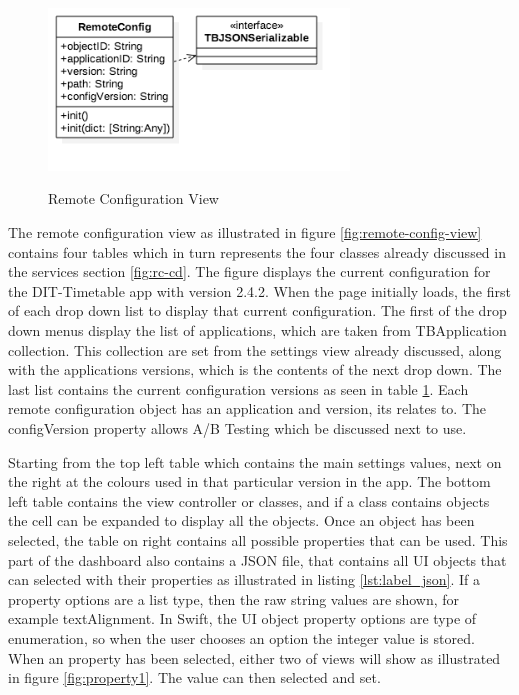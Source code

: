 \begin{figure}[!h]
    \caption{Remote Configuration View}
    \centering
    \includegraphics[width=80mm]{images/classdiagrams/RemoteConfig}
    \label{fig:remote-config-cd}
\end{figure} 

The remote configuration view as illustrated in figure \ref{fig:remote-config-view} contains four tables which in turn represents the four classes already discussed in the services section \ref{fig:rc-cd}. The figure displays the current configuration for the DIT-Timetable app with version 2.4.2. When the page initially loads, the first of each drop down list to display that current configuration. The first of the drop down menus display the list of applications, which are taken from TBApplication collection. This collection are set from the settings view already discussed, along with the applications versions, which is the contents of the next drop down. The last list contains the current configuration versions as seen in table \ref{fig:remote-config-cd}. Each remote configuration object has an application and version, its relates to. The configVersion property allows A/B Testing which be discussed next to use. 

Starting from the top left table which contains the main settings values, next on the right at the colours used in that particular version in the app. The bottom left table contains the view controller or classes, and if a class contains objects the cell can be expanded to display all the objects. Once an object has been selected, the table on right contains all possible properties that can be used. This part of the dashboard also contains a JSON file, that contains all UI objects that can selected with their properties as illustrated in listing \ref{lst:label_json}. If a property options are a list type, then the raw string values are shown, for example textAlignment. In Swift, the UI object property options are type of enumeration, so when the user chooses an option the integer value is stored. When an property has been selected, either two of views will show as illustrated in figure \ref{fig:property1}. The value can then selected and set.

